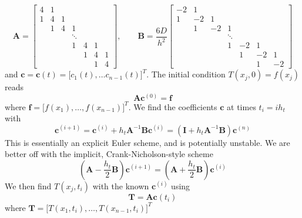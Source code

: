 \documentclass[11pt, a4paper]{article}
\newcommand{\mat}[1]{\mathbf{#1}}
\begin{document}
\begin{equation}
	\mat{A} = 
	\begin{bmatrix}
		4 & 1 &   &   &   &   & \\
		1 & 4 & 1 &   &   &   & \\
		  & 1 & 4 & 1 &   &   & \\
		  &   &  &\ddots &  & \\
		  &   &   & 1 & 4 & 1 & \\
 		  &   &   &   & 1 & 4 & 1 \\
		  &   &   &   &   & 1 & 4
		  
	\end{bmatrix}, \qquad 
	\mat{B} = \frac{6D}{h^{2}}
	\begin{bmatrix}
		-2 & 1 &   &   &   &   & \\
		1 & -2 & 1 &   &   &   & \\
		  & 1 & -2 & 1 &   &   & \\
		  &   &  &\ddots &  & \\
		  &   &   & 1 & -2 & 1 & \\
 		  &   &   &   & 1 & -2 & 1 \\
		  &   &   &   &   & 1 & -2
		  
	\end{bmatrix}
	\label{spec:eq:A-B}
\end{equation}
and $ \bm{c} = \bm{c}(t) = \big[c_{1}(t), \ldots c_{n-1}(t)\big]^{T} $. The initial condition $ T(x_{j}, 0) = f(x_{j}) $ reads
\begin{equation*}
	\mat{A} \bm{c}^{(0)} = \bm{f}
\end{equation*}
where $ \bm{f} = \big[f(x_{1}), \ldots, f(x_{n-1}) \big]^{T} $. We find the coefficients $ \bm{c} $ at times $ t_{i} = i h_{t} $ with
\begin{equation}
	\bm{c}^{(i+1)} = \bm{c}^{(i)} + h_{t}\mat{A}^{-1}\mat{B}\bm{c}^{(i)} = (\mat{I} + h_{t}\mat{A}^{-1}\mat{B})\bm{c}^{(n)} \label{spec:eq:collocation-explicit}
\end{equation}
This is essentially an explicit Euler scheme, and is potentially unstable. We are better off with the implicit, Crank-Nicholson-style scheme
\begin{equation}
	\left(\mat{A} - \frac{h_{t}}{2}\mat{B}\right)\bm{c}^{(i+1)} = \left(\mat{A} + \frac{h_{t}}{2}\mat{B}\right)\bm{c}^{(i)} \label{spec:eq:collocation-implicit}
\end{equation}
We then find $ T(x_{j}, t_{i}) $ with the known $ \bm{c}^{(i)} $ using 
\begin{equation}
	\bm{T} = \mat{A}\bm{c}(t_{i})  \label{spec:eq:collocation-temp}
\end{equation}
where $ \bm{T} = \big[T(x_{1}, t_{i}), \ldots, T(x_{n-1}, t_{i}) \big]^{T} $
\end{document}

